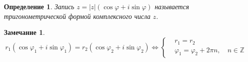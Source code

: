 \documentclass[a4paper,12pt]{article}
\newtheorem*{Def}{Определение}
\newtheorem*{Comment}{Замечание}
\begin{document}
\begin{Def}
Запись $z = |z|(\cos\varphi + i\sin\varphi)$ называется тригонометрической формой комплексного числа $z$.
\end{Def}

\begin{Comment}
\[
r_1(\cos\varphi_1 + i\sin\varphi_1) = r_2(\cos\varphi_2 + i\sin\varphi_2) \Leftrightarrow
\left\{
\begin{aligned}
&r_1 = r_2 \\
&\varphi_1 = \varphi_2 + 2\pi n, \quad n \in \mathbb{Z}
\end{aligned}
\right.
\]
\end{Comment}
\end{document}
